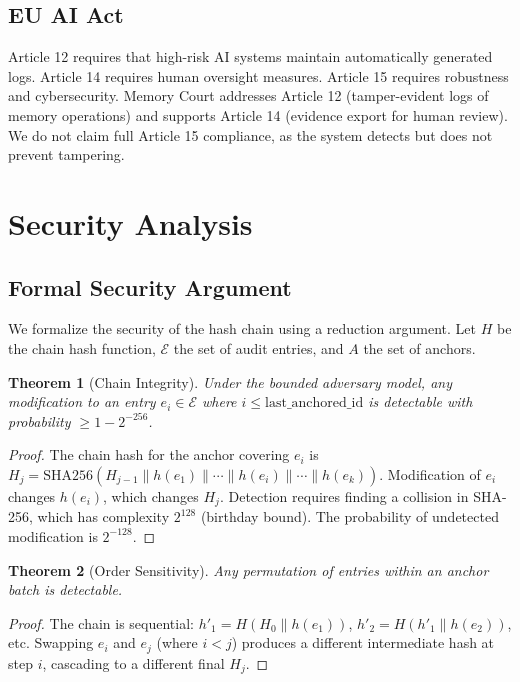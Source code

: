\documentclass[sigconf,nonacm]{acmart}
\newtheorem{theorem}{Theorem}
\begin{document}
\subsection{EU AI Act}
Article 12 requires that high-risk AI systems maintain automatically generated logs. Article 14 requires human oversight measures. Article 15 requires robustness and cybersecurity. Memory Court addresses Article 12 (tamper-evident logs of memory operations) and supports Article 14 (evidence export for human review). We do not claim full Article 15 compliance, as the system detects but does not prevent tampering.
\section{Security Analysis}

\subsection{Formal Security Argument}

We formalize the security of the hash chain using a reduction argument. Let $H$ be the chain hash function, $\mathcal{E}$ the set of audit entries, and $A$ the set of anchors.

\begin{theorem}[Chain Integrity]
Under the bounded adversary model, any modification to an entry $e_i \in \mathcal{E}$ where $i \leq \text{last\_anchored\_id}$ is detectable with probability $\geq 1 - 2^{-256}$.
\end{theorem}
\begin{proof}
The chain hash for the anchor covering $e_i$ is $H_j = \text{SHA256}(H_{j-1} \| h(e_1) \| \cdots \| h(e_i) \| \cdots \| h(e_{k}))$. Modification of $e_i$ changes $h(e_i)$, which changes $H_j$. Detection requires finding a collision in SHA-256, which has complexity $2^{128}$ (birthday bound). The probability of undetected modification is $2^{-128}$.
\end{proof}

\begin{theorem}[Order Sensitivity]
Any permutation of entries within an anchor batch is detectable.
\end{theorem}
\begin{proof}
The chain is sequential: $h'_1 = H(H_0 \| h(e_1))$, $h'_2 = H(h'_1 \| h(e_2))$, etc. Swapping $e_i$ and $e_j$ (where $i < j$) produces a different intermediate hash at step $i$, cascading to a different final $H_j$.
\end{proof}
\end{document}
